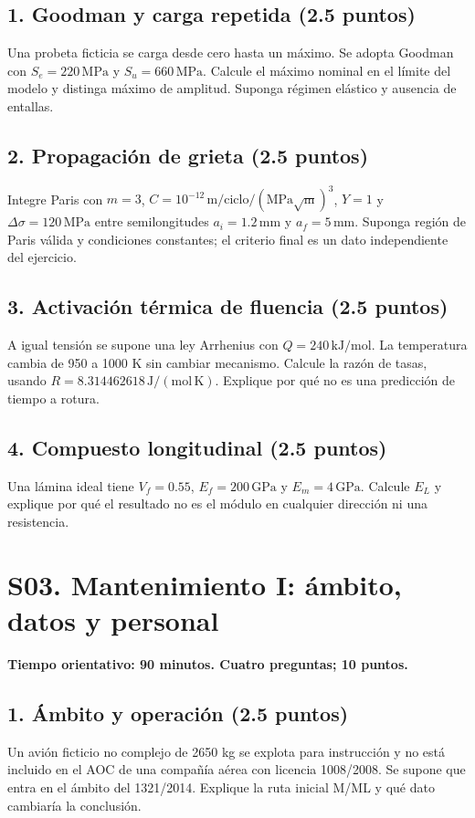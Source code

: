 \section*{1. Goodman y carga repetida (2.5 puntos)}
Una probeta ficticia se carga desde cero hasta un máximo. Se adopta Goodman con $S_e=220\,\mathrm{MPa}$ y $S_u=660\,\mathrm{MPa}$. Calcule el máximo nominal en el límite del modelo y distinga máximo de amplitud. Suponga régimen elástico y ausencia de entallas.

\section*{2. Propagación de grieta (2.5 puntos)}
Integre Paris con $ m=3$, $C=10^{-12}\,\mathrm{m/ciclo}/(\mathrm{MPa\sqrt m})^3$, $Y=1$ y $\Delta\sigma=120\,\mathrm{MPa}$ entre semilongitudes $ a_i=1.2\,\mathrm{mm}$ y $ a_f=5\,\mathrm{mm}$. Suponga región de Paris válida y condiciones constantes; el criterio final es un dato independiente del ejercicio.

\section*{3. Activación térmica de fluencia (2.5 puntos)}
A igual tensión se supone una ley Arrhenius con $Q=240\,\mathrm{kJ/mol}$. La temperatura cambia de 950 a 1000 K sin cambiar mecanismo. Calcule la razón de tasas, usando $R=8.314462618\,\mathrm{J/(mol\,K)}$. Explique por qué no es una predicción de tiempo a rotura.

\section*{4. Compuesto longitudinal (2.5 puntos)}
Una lámina ideal tiene $V_f=0.55$, $E_f=200\,\mathrm{GPa}$ y $E_m=4\,\mathrm{GPa}$. Calcule $E_L$ y explique por qué el resultado no es el módulo en cualquier dirección ni una resistencia.

\chapter{S03. Mantenimiento I: ámbito, datos y personal}
\noindent\textbf{Tiempo orientativo: 90 minutos. Cuatro preguntas; 10 puntos.}
\section*{1. Ámbito y operación (2.5 puntos)}
Un avión ficticio no complejo de 2650 kg se explota para instrucción y no está incluido en el AOC de una compañía aérea con licencia 1008/2008. Se supone que entra en el ámbito del 1321/2014. Explique la ruta inicial M/ML y qué dato cambiaría la conclusión.

